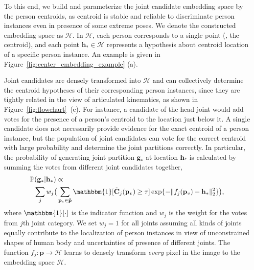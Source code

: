 \documentclass[10pt,twocolumn,letterpaper]{article}
\begin{document}
To this end, we build and parameterize the joint candidate embedding space  by the person centroids, as centroid is  stable and reliable to discriminate  person instances even in presence of some extreme poses. We denote the constructed  embedding space as $\mathcal{H}$. In  $\mathcal{H}$, each person corresponds to a single point (\ie, the centroid), and  each point $\mathbf{h}_{*}{\in}\mathcal{H}$ represents a hypothesis about  centroid location of a specific person instance. An example is given in Figure~\ref{fig:center_embedding_example} (a).

Joint candidates are densely transformed into $ \mathcal{H} $ and can collectively determine  the centroid hypotheses of their corresponding person instances,  since they are tightly related in the view of articulated kinematics, as shown in Figure~\ref{fig:flowchart}~(c). For instance, a candidate of the head joint  would add votes for the presence of a person's centroid to the location just below it. A single candidate does not necessarily provide evidence for the exact centroid of a person instance, but the population of joint candidates can vote for the correct centroid with large probability and determine the joint partitions correctly.
 In particular, the probability of generating joint partition $\mathbf{g}_{*}$ at location $\mathbf{h}_{*}$ is calculated by summing the votes from different joint candidates together, \ie
\begin{equation*}
\begin{aligned}
&\mathbb{P}(\mathbf{g}_{*}|\mathbf{h}_{*}) \propto \\
&\hspace{2mm}\sum_j w_j\big(\sum_{\mathbf{p}_v \in \tilde{\mathbf{p}}}\mathbbm{1}[\tilde{\mathbf{C}}_{j}(\mathbf{p}_v) \geq \tau]\exp\{-\|f_j(\mathbf{p}_v)-\mathbf{h}_{*}\|_2^2\}\big),
\end{aligned}
\end{equation*}
where
$\mathbbm{1}[\cdot]$ is the indicator function and $w_j$ is the weight for the votes from $j$th joint category. We set $w_j{=}1$ for all joints assuming all kinds of joints equally contribute to the localization of person instances in view of unconstrained shapes of human body and uncertainties of presence of different joints. The  function $f_j{:}\mathbf{p} \rightarrow \mathcal{H}$ learns to densely transform  \emph{every} pixel in the image to  the embedding space $\mathcal{H}$. %
\end{document}
